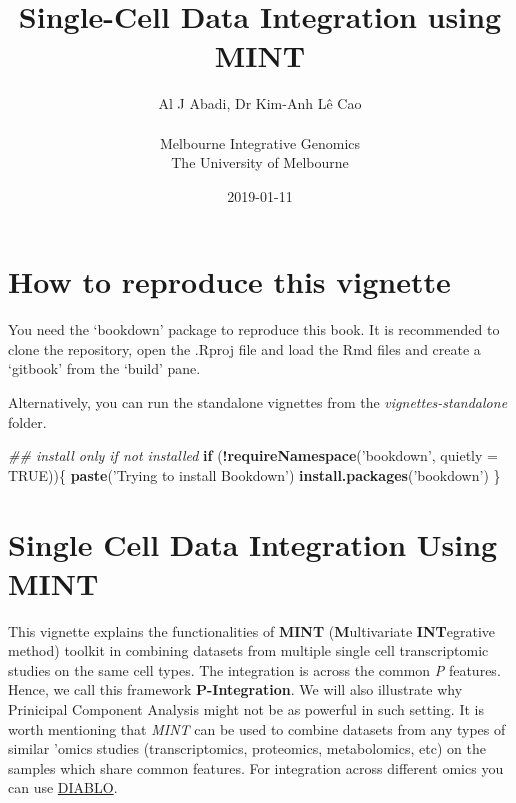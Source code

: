 \documentclass[]{book}
\title{Single-Cell Data Integration using MINT}
\author{Al J Abadi, Dr Kim-Anh Lê Cao\\
~\\
Melbourne Integrative Genomics\\
The University of Melbourne}
\date{2019-01-11}
\newenvironment{Shaded}{\begin{snugshade}}{\end{snugshade}}
\newcommand{\CommentTok}[1]{\textcolor[rgb]{0.56,0.35,0.01}{\textit{#1}}}
\newcommand{\ControlFlowTok}[1]{\textcolor[rgb]{0.13,0.29,0.53}{\textbf{#1}}}
\newcommand{\DataTypeTok}[1]{\textcolor[rgb]{0.13,0.29,0.53}{#1}}
\newcommand{\KeywordTok}[1]{\textcolor[rgb]{0.13,0.29,0.53}{\textbf{#1}}}
\newcommand{\NormalTok}[1]{#1}
\newcommand{\OperatorTok}[1]{\textcolor[rgb]{0.81,0.36,0.00}{\textbf{#1}}}
\newcommand{\OtherTok}[1]{\textcolor[rgb]{0.56,0.35,0.01}{#1}}
\newcommand{\StringTok}[1]{\textcolor[rgb]{0.31,0.60,0.02}{#1}}
\theoremstyle{definition}
\theoremstyle{definition}
\theoremstyle{definition}
\theoremstyle{remark}
\begin{document}
\maketitle

{
\setcounter{tocdepth}{1}
\tableofcontents
}
\hypertarget{how-to-reproduce-this-vignette}{%
\chapter*{How to reproduce this
vignette}\label{how-to-reproduce-this-vignette}}

You need the `bookdown' package to reproduce this book. It is
recommended to clone the repository, open the .Rproj file and load the
Rmd files and create a `gitbook' from the `build' pane.

Alternatively, you can run the standalone vignettes from the
\emph{vignettes-standalone} folder.

\begin{Shaded}
\begin{Highlighting}[]
\CommentTok{## install only if not installed}
\ControlFlowTok{if}\NormalTok{ (}\OperatorTok{!}\KeywordTok{requireNamespace}\NormalTok{(}\StringTok{'bookdown'}\NormalTok{, }\DataTypeTok{quietly =} \OtherTok{TRUE}\NormalTok{))\{}
  \KeywordTok{paste}\NormalTok{(}\StringTok{'Trying to install Bookdown'}\NormalTok{)}
  \KeywordTok{install.packages}\NormalTok{(}\StringTok{'bookdown'}\NormalTok{)}
\NormalTok{\}}
\end{Highlighting}
\end{Shaded}

\hypertarget{single-cell-data-integration-using-mint}{%
\chapter{Single Cell Data Integration Using
MINT}\label{single-cell-data-integration-using-mint}}

This vignette explains the functionalities of \textbf{MINT}
(\textbf{M}ultivariate \textbf{INT}egrative method) \citep{mint} toolkit
in combining datasets from multiple single cell transcriptomic studies
on the same cell types. The integration is across the common \emph{P}
features. Hence, we call this framework \textbf{P-Integration}. We will
also illustrate why Prinicipal Component Analysis might not be as
powerful in such setting. It is worth mentioning that \emph{MINT} can be
used to combine datasets from any types of similar 'omics studies
(transcriptomics, proteomics, metabolomics, etc) on the samples which
share common features. For integration across different omics you can
use \href{http://mixomics.org/mixdiablo/}{DIABLO}.
\end{document}
